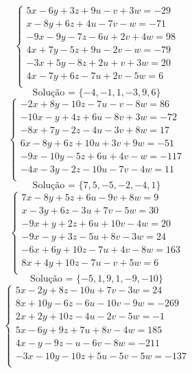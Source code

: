 \documentclass[12pt,oneside,a4paper]{article}
\begin{document}
\vspace{\baselineskip}
\begin{equation*}
\begin{cases}
5x-6y+3z+9u-v+3w=-29 \\
x-8y+6z+4u-7v-w=-71 \\
-9x-9y-7z-6u+2v+4w=98 \\
4x+7y-5z+9u-2v-w=-79 \\
-3x+5y-8z+2u+v+3w=20 \\
4x-7y+6z-7u+2v-5w=6 \\
\end{cases}
\end{equation*}
\begin{equation*}
\text{Solução = }\{-4,-1,1,-3,9,6\}
\end{equation*}
\vspace{\baselineskip}
\begin{equation*}
\begin{cases}
-2x+8y-10z-7u-v-8w=86 \\
-10x-y+4z+6u-8v+3w=-72 \\
-8x+7y-2z-4u-3v+8w=17 \\
6x-8y+6z+10u+3v+9w=-51 \\
-9x-10y-5z+6u+4v-w=-117 \\
-4x-3y-2z-10u-7v-4w=11 \\
\end{cases}
\end{equation*}
\begin{equation*}
\text{Solução = }\{7,5,-5,-2,-4,1\}
\end{equation*}
\vspace{\baselineskip}
\begin{equation*}
\begin{cases}
7x-8y+5z+6u-9v+8w=9 \\
x-3y+6z-3u+7v-5w=30 \\
-9x+y+2z+6u+10v-4w=20 \\
-9x-y+3z-5u+8v-3w=24 \\
-6x+6y+10z-7u+4v-8w=163 \\
8x+4y+10z-7u-v+5w=6 \\
\end{cases}
\end{equation*}
\begin{equation*}
\text{Solução = }\{-5,1,9,1,-9,-10\}
\end{equation*}
\vspace{\baselineskip}
\begin{equation*}
\begin{cases}
5x-2y+8z-10u+7v-3w=24 \\
8x+10y-6z-6u-10v-9w=-269 \\
2x+2y+10z-4u-2v-5w=-1 \\
5x-6y+9z+7u+8v-4w=185 \\
4x-y-9z-u-6v-8w=-211 \\
-3x-10y-10z+5u-5v-5w=-137 \\
\end{cases}
\end{equation*}
\end{document}
